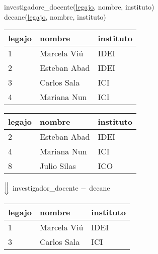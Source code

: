 \documentclass[preview]{standalone}
\begin{document}
investigadore\_docente(\underline{legajo}, nombre, instituto)\\
decane(\underline{legajo}, nombre, instituto)

\begin{center}
\begin{tabular}{| l | l | l |}\hline
	legajo & nombre & instituto \\\hline			
	1 & Marcela Vi\'u  & IDEI \\
	2 & Esteban Abad &  IDEI \\
	3 & Carlos Sala & ICI \\
	4 & Mariana Nun & ICI \\\hline
\end{tabular}
\quad
\begin{tabular}{| l | l | l |}\hline
	legajo & nombre & instituto \\\hline			
	2 & Esteban Abad &  IDEI \\
	4 & Mariana Nun & ICI \\
	8 & Julio Silas & ICO \\\hline
\end{tabular}
\vspace{.35cm}

$\Big\Downarrow$ investigador\_docente ${\Large -}$ decane
\vspace{.35cm}

\begin{tabular}{| l | l | l |}\hline
	legajo & nombre & instituto \\\hline			
	1 & Marcela Vi\'u  & IDEI \\
	3 & Carlos Sala & ICI \\\hline
\end{tabular}
\end{center}
\end{document}

